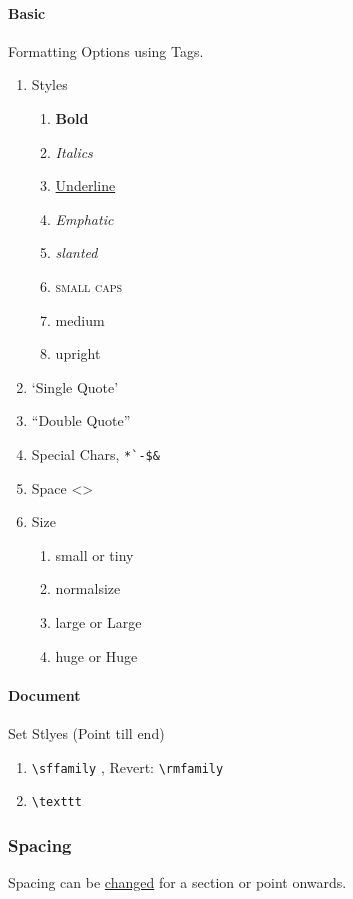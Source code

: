 \documentclass{report}[a4paper,12pt] %
\begin{document}
\paragraph{Basic} Formatting Options using Tags.
\begin{enumerate}
  \item Styles
  \begin{enumerate}
    \item \textbf{Bold}
    \item \textit{Italics}
    \item \underline{Underline}
    \item \emph{Emphatic}
    \item \textsl{slanted}
    \item \textsc{small caps}
    \item \textmd{medium}
    \item \textup{upright}
  \end{enumerate}
  \item `Single Quote'
  \item ``Double Quote''
  \item Special Chars, \verb|*`-$&|
  \item Space <\space>
  \item Size
  \begin{enumerate}
    \item \small small or \tiny tiny
    \item \normalsize normalsize
    \item \large large or \Large Large
    \item \huge huge or \Huge Huge
  \end{enumerate}
\end{enumerate}

\paragraph{Document} Set Stlyes (Point till end)
\begin{enumerate}
  \item \verb|\sffamily| , Revert: \verb|\rmfamily|
  \item \verb|\texttt| 
\end{enumerate}

\subsubsection{Spacing} 
Spacing can be \href{https://www.overleaf.com/learn/latex/Articles/How_to_change_paragraph_spacing_in_LaTeX}{changed} for a section or point onwards.
\end{document}
